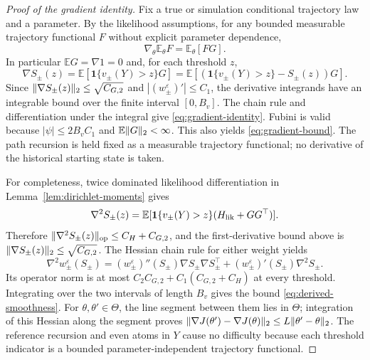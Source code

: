 \documentclass[11pt]{article}
\newcommand{\E}{\mathbb E}
\newcommand{\1}{\mathbf 1}
\newcommand{\op}{\mathrm{op}}
\DeclarePairedDelimiter{\norm}{\lVert}{\rVert}
\newcommand{\eps}{\varepsilon}
\begin{document}
\begin{proof}[Proof of the gradient identity]
Fix a true or simulation conditional trajectory law and a parameter. By the likelihood assumptions, for any bounded measurable trajectory functional $F$ without explicit parameter dependence,
\begin{equation}\label{eq:likelihood-interface}
 \nabla_\theta\E_\theta F=\E_\theta[FG].
\end{equation}
In particular $\E G=\nabla 1=0$ and, for each threshold $z$,
\[
 \nabla S_\pm(z)=\E[\1\{v_\pm(Y)>z\}G]
 =\E[(\1\{v_\pm(Y)>z\}-S_\pm(z))G].
\]
Since $\norm{\nabla S_\pm(z)}_2\le\sqrt{C_{G,2}}$ and $|(w_\pm^\eps)'|\le C_1$, the derivative integrands have an integrable bound over the finite interval $[0,B_v]$. The chain rule and differentiation under the integral give \eqref{eq:gradient-identity}. Fubini is valid because $|\psi|\le2B_vC_1$ and $\E\norm{G}_2<\infty$. This also yields \eqref{eq:gradient-bound}. The path recursion is held fixed as a measurable trajectory functional; no derivative of the historical starting state is taken.

For completeness, twice dominated likelihood differentiation in Lemma~\ref{lem:dirichlet-moments} gives
\[
 \nabla^2 S_\pm(z)=\E[\1\{v_\pm(Y)>z\}(H_{\rm lik}+GG^\top)].
\]
Therefore $\norm{\nabla^2S_\pm(z)}_{\op}\le C_H+C_{G,2}$, and the first-derivative bound above is $\norm{\nabla S_\pm(z)}_2\le\sqrt{C_{G,2}}$. The Hessian chain rule for either weight yields
\[
 \nabla^2 w_\pm^\eps(S_\pm)
 =(w_\pm^\eps)''(S_\pm)\nabla S_\pm\nabla S_\pm^\top
 +(w_\pm^\eps)'(S_\pm)\nabla^2S_\pm.
\]
Its operator norm is at most $C_2C_{G,2}+C_1(C_{G,2}+C_H)$ at every threshold. Integrating over the two intervals of length $B_v$ gives the bound \eqref{eq:derived-smoothness}. For $\theta,\theta'\in\Theta$, the line segment between them lies in $\Theta$; integration of this Hessian along the segment proves
$\norm{\nabla J(\theta')-\nabla J(\theta)}_2\le L\norm{\theta'-\theta}_2$.
The reference recursion and even atoms in $Y$ cause no difficulty because each threshold indicator is a bounded parameter-independent trajectory functional.
\end{proof}
\end{document}

